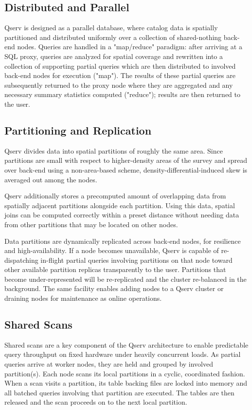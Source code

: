 \documentclass[11pt,twoside]{article}
\begin{document}
\subsection{Distributed and Parallel}

Qserv is designed as a parallel database, where catalog data is spatially partitioned and distributed
uniformly over a collection of shared-nothing back-end nodes.  Queries are handled in a "map/reduce" paradigm:
after arriving at a SQL proxy, queries are analyzed for spatial coverage and rewritten into a collection of
supporting partial queries which are then distributed to involved back-end nodes for execution ("map"). The
results of these partial queries are subsequently returned to the proxy node where they are aggregated and any
necessary summary statistics computed ("reduce"); results are then returned to the user.

\subsection{Partitioning and Replication}

Qserv divides data into spatial partitions of roughly the same area.  Since partitions are small with respect
to higher-density areas of the survey and spread over back-end using a non-area-based scheme,
density-differential-induced skew is averaged out among the nodes.

Qserv additionally stores a precomputed amount of overlapping data from spatially adjacent partitions
alongside each partition.  Using this data, spatial joins can be computed correctly within a preset
distance without needing data from other partitions that may be located on other nodes.

Data partitions are dynamically replicated across back-end nodes, for resilience and high-availability.  If a
node becomes unavailable, Qserv is capable of re-dispatching in-flight partial queries involving partitions on
that node toward other available partition replicas transparently to the user.  Partitions that become
under-represented will be re-replicated and the cluster re-balanced in the background.  The same facility
enables adding nodes to a Qserv cluster or draining nodes for maintenance as online operations.

\subsection{Shared Scans}

Shared scans are a key component of the Qserv architecture to enable predictable query throughput on fixed
hardware under heavily concurrent loads.  As partial queries arrive at worker nodes, they are held and grouped
by involved partition(s).  Each node scans its local partitions in a cyclic, coordinated fashion. When a scan
visits a partition, its table backing files are locked into memory and all batched queries involving that
partition are executed.  The tables are then released and the scan proceeds on to the next local partition.
\end{document}
